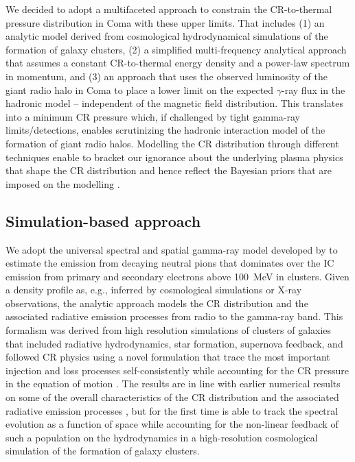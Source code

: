 \documentclass[12pt,manuscript]{aastex}
\begin{document}
We decided to adopt a multifaceted approach to constrain the CR-to-thermal
pressure distribution in Coma with these upper limits. That includes (1) an
analytic model derived from cosmological hydrodynamical simulations of the
formation of galaxy clusters, (2) a simplified multi-frequency analytical
approach that assumes a constant CR-to-thermal energy density and a power-law
spectrum in momentum, and (3) an approach that uses the observed luminosity of
the giant radio halo in Coma to place a lower limit on the expected $\gamma$-ray
flux in the hadronic model -- independent of the magnetic field distribution.
This translates into a minimum CR pressure which, if challenged by tight
gamma-ray limits/detections, enables scrutinizing the hadronic interaction model
of the formation of giant radio halos.  Modelling the CR distribution through
different techniques enable to bracket our ignorance about the underlying plasma
physics that shape the CR distribution and hence reflect the Bayesian priors
that are imposed on the modelling \citep[see][for a
discussion]{2011arXiv1105.3240P}.



\subsection{Simulation-based approach}

We adopt the universal spectral and spatial gamma-ray model developed by
\citet{2010MNRAS.409..449P} to estimate the emission from decaying neutral pions
that dominates over the IC emission from primary and secondary electrons above
100~MeV in clusters. Given a density profile as, e.g., inferred by cosmological
simulations or X-ray observations, the analytic approach models the CR
distribution and the associated radiative emission processes from radio to the
gamma-ray band.  This formalism was derived from high resolution simulations of
clusters of galaxies that included radiative hydrodynamics, star formation,
supernova feedback, and followed CR physics using a novel formulation that trace
the most important injection and loss processes self-consistently while
accounting for the CR pressure in the equation of motion
\citep{2006MNRAS.367..113P,2007A&A...473...41E,2008A&A...481...33J}.  The
results are in line with earlier numerical results on some of the overall
characteristics of the CR distribution and the associated radiative emission
processes \citep{2000A&A...362..151D,2001ApJ...559...59M,2003MNRAS.342.1009M,
  2007MNRAS.378..385P,2008MNRAS.385.1211P,2008MNRAS.385.1242P}, but for the
first time is able to track the spectral evolution as a function of space while
accounting for the non-linear feedback of such a population on the hydrodynamics
in a high-resolution cosmological simulation of the formation of galaxy
clusters.
 
\end{document}
